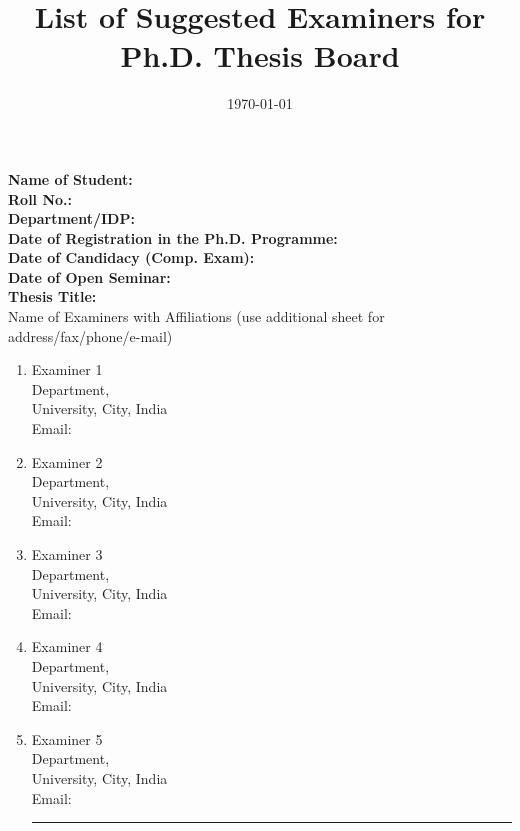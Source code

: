 \documentclass[11pt]{article}
\title{List of Suggested Examiners for Ph.D. Thesis Board}
\date{\today}
\begin{document}
\maketitle

\noindent
{\bf Name of Student:} \\
{\bf Roll No.:} \\
{\bf Department/IDP:} \\
{\bf Date of Registration in the Ph.D. Programme:} \\
{\bf Date of Candidacy (Comp. Exam):} \\
{\bf Date of Open Seminar:} \\
{\bf Thesis Title:} \\

\noindent
Name of Examiners with Affiliations (use additional sheet for address/fax/phone/e-mail)
\begin{enumerate}
    \item Examiner 1\\
        Department,\\
        University, City, India\\
        Email:
    \item Examiner 2\\
        Department,\\
        University, City, India\\
        Email:
    \item Examiner 3\\
        Department,\\
        University, City, India\\
        Email:
    \item Examiner 4\\
        Department,\\
        University, City, India\\
        Email:
    \item Examiner 5\\
        Department,\\
        University, City, India\\
        Email:

    \hrule


\end{enumerate}
\end{document}
